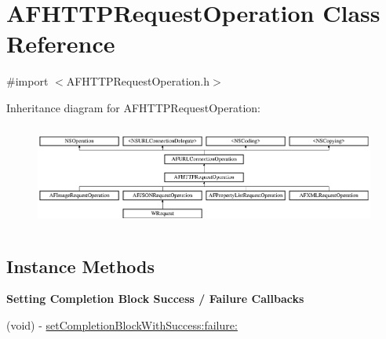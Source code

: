 \hypertarget{interface_a_f_h_t_t_p_request_operation}{\section{A\-F\-H\-T\-T\-P\-Request\-Operation Class Reference}
\label{interface_a_f_h_t_t_p_request_operation}
}


{\ttfamily \#import $<$A\-F\-H\-T\-T\-P\-Request\-Operation.\-h$>$}

Inheritance diagram for A\-F\-H\-T\-T\-P\-Request\-Operation\-:\begin{figure}[H]
\begin{center}
\leavevmode
\includegraphics[height=3.414634cm]{interface_a_f_h_t_t_p_request_operation}
\end{center}
\end{figure}
\subsection*{Instance Methods}
\begin{Indent}{\bf Setting Completion Block Success / Failure Callbacks}\par
{\em 

 

 }\begin{DoxyCompactItemize}
\item 
(void) -\/ \hyperlink{interface_a_f_h_t_t_p_request_operation_a2b9008e6fb9fc14bf7052b26cdfad80c}{set\-Completion\-Block\-With\-Success\-:failure\-:}
\end{DoxyCompactItemize}
\end{Indent}
